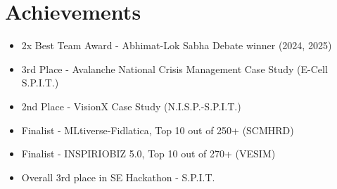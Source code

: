 \documentclass[10pt]{article}
\begin{document}
\section*{Achievements}
\begin{itemize}[leftmargin=*]

  \item 2x Best Team Award - Abhimat-Lok Sabha Debate winner (2024, 2025)

  \item 3rd Place - Avalanche National Crisis Management Case Study (E-Cell S.P.I.T.)

  \item 2nd Place - VisionX Case Study (N.I.S.P.-S.P.I.T.)

  \item Finalist - MLtiverse-Fidlatica, Top 10 out of 250+ (SCMHRD)

  \item Finalist - INSPIRIOBIZ 5.0, Top 10 out of 270+ (VESIM)

  \item Overall 3rd place in SE Hackathon - S.P.I.T.

\end{itemize}
\end{document}
